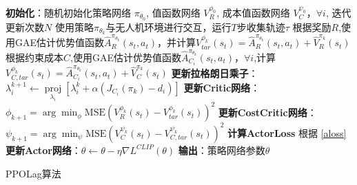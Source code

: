 \begin{algorithm}[H]
    \begin{algorithmic}[1] %
        \STATE \textbf{初始化}：随机初始化策略网络 $\pi_{\theta_{0}}$, 值函数网络 $V_{R}^{\phi_{0}}$, 成本值函数网络 $V_{C}^{\psi_{0}}$，$\forall i$, 迭代更新次数$N$
        \STATE 使用策略$\pi_{\theta_{k}}$与无人机环境进行交互，运行$T$步收集轨迹$\tau$
        \STATE 根据奖励$R$,使用GAE估计优势值函数$\hat{A}_{R}^{\pi_{\theta_{k}}}\left(s_{t}, a_{t}\right)$，并计算$V_{tar}^{\phi_{k}}\left(s_{t}\right)=\hat{A}_{R}^{\pi_{\theta_{k}}}\left(s_{t}, a_{t}\right)+\hat{V}_{R}^{\pi_{k}}(s_{t})$
        \STATE 根据约束成本$C$,使用GAE估计优势值函数$\hat{A}_{C_{i}}^{\pi_{\theta_{k}}}\left(s_{t}, a_{t}\right)$，$\forall i$,计算$V_{C,tar}^{\phi_{k}}\left(s_{t}\right)=\hat{A}_{C_{i}}^{\pi_{\theta_{k}}}\left(s_{t}, a_{t}\right)+\hat{V}_{C}^{\pi_{k}}(s_{t})$
                    \STATE \textbf{更新拉格朗日乘子}：$\lambda_{i}^{k+1} \leftarrow \underset{\lambda_{i}}{\operatorname{proj}}\left[\lambda_{i}^{k}+\alpha\left(J_{C_{i}}(\pi_{k})-d_{i}\right)\right]$
                    \STATE \textbf{更新Critic网络}：$\phi_{k+1}=\arg \min _{\phi}\text{MSE}\left(V_{R}^{\phi_{k}}\left(s_{t}\right)-V_{tar}^{\phi_{k}}\left(s_{t}\right)\right)^{2}$
                    \STATE \textbf{更新CostCritic网络}：$\psi_{k+1}=\arg \min _{\psi}\text{MSE}\left(V_{C}^{\psi_{k}}\left(s_{t}\right)-V_{C,tar}^{\psi_{k}}\left(s_{t}\right)\right)^{2}$
                    \STATE \textbf{计算ActorLoss} 根据 \autoref{aloss}
                    \STATE \textbf{更新Actor网络}：$\theta \leftarrow \theta-\eta \nabla L^{C L I P}(\theta)$
                \ENDFOR
            \ENDFOR
        \ENDFOR
        \STATE \textbf{输出}：策略网络参数$\theta$
    \end{algorithmic}
    \caption{\label{alg:ppolag}PPOLag算法}
\end{algorithm}
